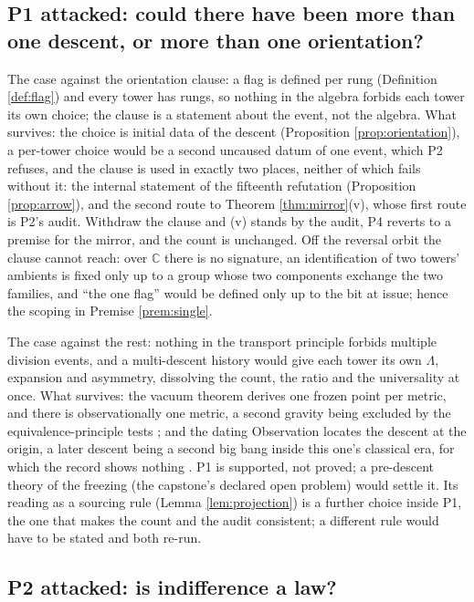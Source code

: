 \documentclass[11pt]{article}
\theoremstyle{definition}
\newcommand{\C}{\mathbb{C}}
\begin{document}
\subsection*{P1 attacked: could there have been more than one descent, or more than one orientation?}

The case against the orientation clause: a flag is defined per rung (Definition \ref{def:flag}) and every tower has rungs, so nothing in the algebra forbids each tower its own choice; the clause is a statement about the event, not the algebra. What survives: the choice is initial data of the descent (Proposition \ref{prop:orientation}), a per-tower choice would be a second uncaused datum of one event, which P2 refuses, and the clause is used in exactly two places, neither of which fails without it: the internal statement of the fifteenth refutation (Proposition \ref{prop:arrow}), and the second route to Theorem \ref{thm:mirror}(v), whose first route is P2's audit. Withdraw the clause and (v) stands by the audit, P4 reverts to a premise for the mirror, and the count is unchanged. Off the reversal orbit the clause cannot reach: over $\C$ there is no signature, an identification of two towers' ambients is fixed only up to a group whose two components exchange the two families, and ``the one flag'' would be defined only up to the bit at issue; hence the scoping in Premise \ref{prem:single}.

The case against the rest: nothing in the transport principle forbids multiple division events, and a multi-descent history would give each tower its own $\Lambda$, expansion and asymmetry, dissolving the count, the ratio and the universality at once. What survives: the vacuum theorem derives one frozen point per metric, and there is observationally one metric, a second gravity being excluded by the equivalence-principle tests \cite{ButlerT6}; and the dating Observation locates the descent at the origin, a later descent being a second big bang inside this one's classical era, for which the record shows nothing \cite[Obs.~7.4]{ButlerT12}. P1 is supported, not proved; a pre-descent theory of the freezing (the capstone's declared open problem) would settle it. Its reading as a sourcing rule (Lemma \ref{lem:projection}) is a further choice inside P1, the one that makes the count and the audit consistent; a different rule would have to be stated and both re-run.

\subsection*{P2 attacked: is indifference a law?}
\end{document}
